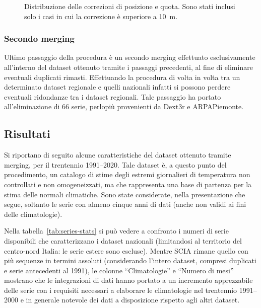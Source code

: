 \begin{figure}[ht]
  \centering
  
  \caption{Distribuzione delle correzioni di posizione e quota. Sono stati inclusi solo i casi in cui la correzione è superiore a \qty{10}{\meter}.}\label{fig:corrections-deltas}
\end{figure}

\subsubsection{Secondo merging}
Ultimo passaggio della procedura è un secondo merging effettuato esclusivamente all'interno del dataset ottenuto tramite i passaggi precedenti, al fine di eliminare eventuali duplicati rimasti. Effettuando la procedura di volta in volta tra un determinato dataset regionale e quelli nazionali infatti si possono perdere eventuali ridondanze tra i dataset regionali. Tale passaggio ha portato all'eliminazione di 66 serie, perlopiù provenienti da Dext3r e ARPAPiemonte.

\subsection{Risultati}\label{ch:results}
Si riportano di seguito alcune caratteristiche del dataset ottenuto tramite merging, per il trentennio 1991--2020. Tale dataset è, a questo punto del procedimento, un catalogo di stime degli estremi giornalieri di temperatura non controllati e non omogeneizzati, ma che rappresenta una base di partenza per la stima delle normali climatiche. Sono state considerate, nella presentazione che segue, soltanto le serie con almeno cinque anni di dati (anche non validi ai fini delle climatologie).

Nella tabella~\ref{tab:series-stats} si può vedere a confronto i numeri di serie disponibili che caratterizzano i dataset nazionali (limitandosi al territorio del centro-nord Italia: le serie estere sono escluse). Mentre SCIA rimane quello con più sequenze in termini assoluti (considerando l'intero dataset, compresi duplicati e serie antecedenti al 1991), le colonne ``Climatologie'' e ``Numero di mesi'' mostrano che le integrazioni di dati hanno portato a un incremento apprezzabile delle serie con i requisiti necessari a elaborare le climatologie nel trentennio 1991--2000 e in generale notevole dei dati a disposizione rispetto agli altri dataset.

